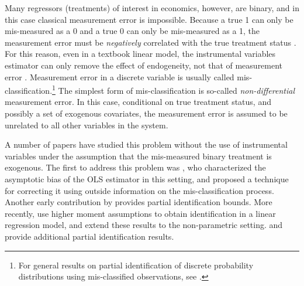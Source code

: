 Many regressors (treatments) of interest in economics, however, are binary, and in this case classical measurement error is impossible.
Because a true 1 can only be mis-measured as a 0 and a true 0 can only be mis-measured as a 1, the measurement error must be \emph{negatively} correlated with the true treatment status \citep{Aigner,Bollinger}. 
For this reason, even in a textbook linear model, the instrumental variables estimator can only remove the effect of endogeneity, not that of measurement error \cite{FL}. 
Measurement error in a discrete variable is usually called mis-classification.\footnote{For general results on partial identification of discrete probability distributions using mis-classified observations, see \cite{molinari}.}
The simplest form of mis-classification is so-called \emph{non-differential} measurement error.
In this case, conditional on true treatment status, and possibly a set of exogenous covariates, the measurement error is assumed to be unrelated to all other variables in the system.

A number of papers have studied this problem without the use of instrumental variables under the assumption that the mis-measured binary treatment is exogenous.
The first to address this problem was \cite{Aigner}, who characterized the asymptotic bias of the OLS estimator in this setting, and proposed a technique for correcting it using outside information on the mis-classification process.
Another early contribution by \cite{Bollinger} provides partial identification bounds.
More recently, \cite{ChenHuLewbel} use higher moment assumptions to obtain identification in a linear regression model, and \cite{ChenHuLewbel2} extend these results to the non-parametric setting. 
\cite{HasseltBollinger} and \cite{BollingerHasseltWP} provide additional partial identification results.

